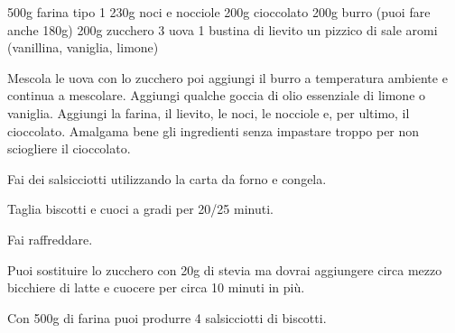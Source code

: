 \begin{ingreds}
	500g farina tipo 1
	230g noci e nocciole
	200g cioccolato
	200g burro (puoi fare anche 180g)
	200g zucchero
	3 uova
	1 bustina di lievito
	un pizzico di sale
	aromi (vanillina, vaniglia, limone)

\end{ingreds}

\begin{method}
	Mescola le uova con lo zucchero poi aggiungi il burro a temperatura ambiente e continua a mescolare. Aggiungi qualche goccia di olio essenziale di limone o vaniglia. Aggiungi la farina, il lievito, le noci, le nocciole e, per ultimo, il cioccolato. Amalgama bene gli ingredienti senza impastare troppo per non sciogliere il cioccolato.
	
	Fai dei salsicciotti utilizzando la carta da forno e congela.
	
	Taglia biscotti e cuoci a  gradi per 20/25 minuti.

	Fai raffreddare.

\end {method}
	\begin{note}
		Puoi sostituire lo zucchero con 20g di stevia ma dovrai aggiungere circa mezzo bicchiere di latte e cuocere per circa 10 minuti in più.
		
		Con 500g di farina puoi produrre 4 salsicciotti di biscotti.

	\end{note}

